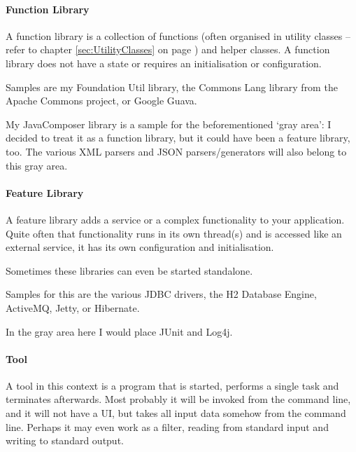 \documentclass[11pt,a4paper, titlepage, parskip=half, headsepline, footsepline, cleardoublepage=current, headheight=1cm]{scrbook}
\newcommand*{\tqvref}[1]{\hyperref[{#1}]{\ref*{#1}} on page \pageref{#1}}
\begin{document}
\paragraph{Function Library}\label{sec:FunctionLibrary}
A function library is a collection of functions (often organised in utility classes – refer to chapter \tqvref{sec:UtilityClasses}) and helper classes. A function library does not have a state or requires an initialisation or configuration.

Samples are my Foundation Util library\autocite{TQUADRAT_ORG_FOUNDATION_UTIL}, the Commons Lang library from the Apache Commons project\autocite{APACHE_COMMONS_LANG}, or Google Guava\autocite{GOOGLE_GUAVA}.

My JavaComposer library\autocite{TQUADRAT_ORG_FOUNDATION_JAVACOMPOSER} is a sample for the beforementioned ‘gray area’: I decided to treat it as a function library, but it could have been a feature library, too. The various XML parsers and JSON parsers/generators will also belong to this gray area. 

\paragraph{Feature Library}\label{sec:FeatureLibrary}
A feature library adds a service or a complex functionality to your application. Quite often that functionality runs in its own thread(s) and is accessed like an external service, it has its own configuration and initialisation.

Sometimes these libraries can even be started standalone.

Samples for this are the various JDBC drivers, the H2 Database Engine\autocite{H2_DATABASE}, ActiveMQ\autocite{APACHE_ACTIVEMQ}, Jetty\autocite{ECLIPSE_JETTY}, or Hibernate\autocite{HIBERNATE_ORM}.

In the gray area here I would place JUnit\autocite{JUNIT5} and Log4j\autocite{APACHE_LOG4J}.

\paragraph{Tool}\label{sec:Tool}
A tool in this context is a program that is started, performs a single task and terminates afterwards. Most probably it will be invoked from the command line, and it will not have a UI, but takes all input data somehow from the command line. Perhaps it may even work as a filter\autocite{WIKIPEDIA:Filter}, reading from standard input and writing to standard output.
\end{document}
